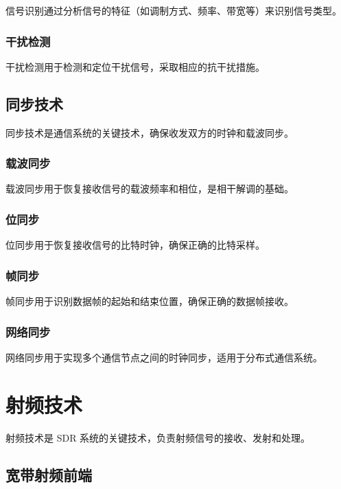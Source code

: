 \documentclass[UTF8]{ctexbook}
\begin{document}
信号识别通过分析信号的特征（如调制方式、频率、带宽等）来识别信号类型。

\subsubsection{干扰检测}

干扰检测用于检测和定位干扰信号，采取相应的抗干扰措施。

\subsection{同步技术}

同步技术是通信系统的关键技术，确保收发双方的时钟和载波同步。

\subsubsection{载波同步}

载波同步用于恢复接收信号的载波频率和相位，是相干解调的基础。

\subsubsection{位同步}

位同步用于恢复接收信号的比特时钟，确保正确的比特采样。

\subsubsection{帧同步}

帧同步用于识别数据帧的起始和结束位置，确保正确的数据帧接收。

\subsubsection{网络同步}

网络同步用于实现多个通信节点之间的时钟同步，适用于分布式通信系统。

\section{射频技术}

射频技术是 SDR 系统的关键技术，负责射频信号的接收、发射和处理。

\subsection{宽带射频前端}
\end{document}
